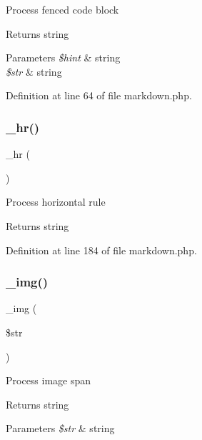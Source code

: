Process fenced code block \begin{DoxyReturn}{Returns}
string 
\end{DoxyReturn}

\begin{DoxyParams}{Parameters}
{\em \$hint} & string \\
\hline
{\em \$str} & string \\
\hline
\end{DoxyParams}


Definition at line 64 of file markdown.\+php.

\hypertarget{class_markdown_a794a9d5fa6b867db9eaecd18fa8394de}{}\label{class_markdown_a794a9d5fa6b867db9eaecd18fa8394de} 
\subsubsection{\texorpdfstring{\+\_\+hr()}{\_hr()}}
{\footnotesize\ttfamily \+\_\+hr (\begin{DoxyParamCaption}{ }\end{DoxyParamCaption})\hspace{0.3cm}{\ttfamily [protected]}}

Process horizontal rule \begin{DoxyReturn}{Returns}
string 
\end{DoxyReturn}


Definition at line 184 of file markdown.\+php.

\hypertarget{class_markdown_a29692127c6b62aed5fba05bc7d2aba5f}{}\label{class_markdown_a29692127c6b62aed5fba05bc7d2aba5f} 
\subsubsection{\texorpdfstring{\+\_\+img()}{\_img()}}
{\footnotesize\ttfamily \+\_\+img (\begin{DoxyParamCaption}\item[{}]{\$str }\end{DoxyParamCaption})\hspace{0.3cm}{\ttfamily [protected]}}

Process image span \begin{DoxyReturn}{Returns}
string 
\end{DoxyReturn}

\begin{DoxyParams}{Parameters}
{\em \$str} & string \\
\hline
\end{DoxyParams}


